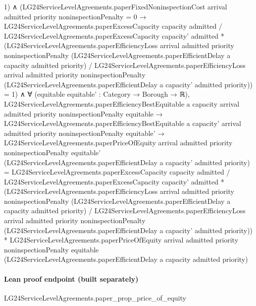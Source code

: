 \documentclass[10pt]{article}
\begin{document}
\begin{ReviewVerbatim}
                1) ∧
            (LG24ServiceLevelAgreements.paperFixedNoninspectionCost arrival admitted priority noninspectionPenalty = 0 →
                LG24ServiceLevelAgreements.paperExcessCapacity capacity admitted /
                      LG24ServiceLevelAgreements.paperExcessCapacity capacity' admitted *
                    (LG24ServiceLevelAgreements.paperEfficiencyLoss arrival admitted priority noninspectionPenalty
                        (LG24ServiceLevelAgreements.paperEfficientDelay a capacity admitted priority) /
                      LG24ServiceLevelAgreements.paperEfficiencyLoss arrival admitted priority noninspectionPenalty
                        (LG24ServiceLevelAgreements.paperEfficientDelay a capacity' admitted priority)) =
                  1) ∧
              ∀ (equitable equitable' : Category → Borough → ℝ),
                LG24ServiceLevelAgreements.paperEfficiencyBestEquitable a capacity arrival admitted priority
                    noninspectionPenalty equitable →
                  LG24ServiceLevelAgreements.paperEfficiencyBestEquitable a capacity' arrival admitted priority
                      noninspectionPenalty equitable' →
                    LG24ServiceLevelAgreements.paperPriceOfEquity arrival admitted priority noninspectionPenalty
                        equitable' (LG24ServiceLevelAgreements.paperEfficientDelay a capacity' admitted priority) =
                      LG24ServiceLevelAgreements.paperExcessCapacity capacity admitted /
                            LG24ServiceLevelAgreements.paperExcessCapacity capacity' admitted *
                          (LG24ServiceLevelAgreements.paperEfficiencyLoss arrival admitted priority noninspectionPenalty
                              (LG24ServiceLevelAgreements.paperEfficientDelay a capacity admitted priority) /
                            LG24ServiceLevelAgreements.paperEfficiencyLoss arrival admitted priority
                              noninspectionPenalty
                              (LG24ServiceLevelAgreements.paperEfficientDelay a capacity' admitted priority)) *
                        LG24ServiceLevelAgreements.paperPriceOfEquity arrival admitted priority noninspectionPenalty
                          equitable (LG24ServiceLevelAgreements.paperEfficientDelay a capacity admitted priority)
\end{ReviewVerbatim}

\paragraph{Lean proof endpoint (built separately)}\begin{ReviewVerbatim}
LG24ServiceLevelAgreements.paper_prop_price_of_equity
\end{ReviewVerbatim}
\end{document}
